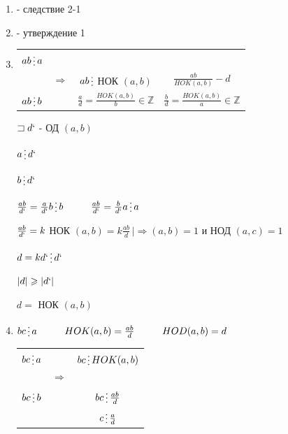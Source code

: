 \documentclass[12pt]{article}
\begin{document}
\begin{enumerate}
    \item - следствие 2-1
    \item - утверждение 1
    \item
          \begin{tabular}{c|ccc}
              $ab \mathop{\raisebox{-2pt}{\vdots}} a$                                                                                                                         \\
                                                      & $\Rightarrow$ & $ab \mathop{\raisebox{-2pt}{\vdots}}$ НОК $(a,b)$ & $\frac{ab}{HOK(a,b)} -d$                          \\
              $ab \mathop{\raisebox{-2pt}{\vdots}} b$ &               & $\frac{a}{d} = \frac{HOK(a,b)}{b} \in \mathbb{Z}$ & $\frac{b}{d} = \frac{HOK(a,b)}{a} \in \mathbb{Z}$ \\
          \end{tabular}\par
          $\sqsupset d`$ - ОД $(a,b)$\par
          $a \mathop{\raisebox{-2pt}{\vdots}} d`$\par
          $b \mathop{\raisebox{-2pt}{\vdots}} d`$\par
          $\frac{ab}{d`} = \frac{a}{d`}b \mathop{\raisebox{-2pt}{\vdots}} b \hspace{1 cm} \frac{ab}{d`} = \frac{b}{d`}a \mathop{\raisebox{-2pt}{\vdots}} a$\par
          $\frac{ab}{d`}=k$ НОК $(a,b) = k \frac{ab}{d} \, | \Rightarrow (a,b) = 1$ и НОД $(a,c)=1$\par
          $d = kd` \mathop{\raisebox{-2pt}{\vdots}} d`$\par
          $|d| \geqslant |d`|$\par
          $d =$ НОК $(a,b)$\par
    \item $bc \mathop{\raisebox{-2pt}{\vdots}} a \hspace{1 cm} HOK(a,b) = \frac{ab}{d} \hspace{1 cm} HOD(a,b) = d$\par
          \begin{tabular}{c|cc}
              $bc \mathop{\raisebox{-2pt}{\vdots}} a$ &               & $bc \mathop{\raisebox{-2pt}{\vdots}} HOK(a,b)$     \\
                                                      & $\Rightarrow$                                                      \\
              $bc \mathop{\raisebox{-2pt}{\vdots}} b$ &               & $bc \mathop{\raisebox{-2pt}{\vdots}} \frac{ab}{d}$ \\
                                                      &               & $c \mathop{\raisebox{-2pt}{\vdots}} \frac{a}{d}$   \\
          \end{tabular}\par


\end{enumerate}
\end{document}
